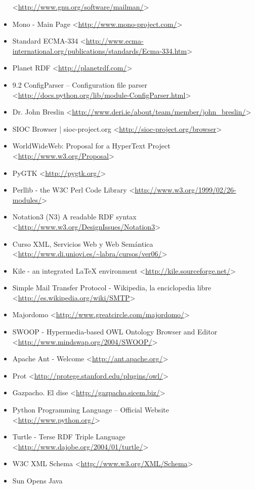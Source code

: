 \begin{itemize}
 <\url{http://www.gnu.org/software/mailman/}>
 \item Mono - Main Page 
 <\url{http://www.mono-project.com/}>
 \item Standard ECMA-334
 <\url{http://www.ecma-international.org/publications/standards/Ecma-334.htm}>
 \item Planet RDF
 <\url{http://planetrdf.com/}>
 \item 9.2 ConfigParser -- Configuration file parser
 <\url{http://docs.python.org/lib/module-ConfigParser.html}>
 \item Dr. John Breslin
 <\url{http://www.deri.ie/about/team/member/john_breslin/}>
 \item SIOC Browser | sioc-project.org
 <\url{http://sioc-project.org/browser}>
 \item WorldWideWeb: Proposal for a HyperText Project
 <\url{http://www.w3.org/Proposal}>
 \item PyGTK
 <\url{http://pygtk.org/}>
 \item Perllib - the W3C Perl Code Library
 <\url{http://www.w3.org/1999/02/26-modules/}>
 \item Notation3 (N3) A readable RDF syntax
 <\url{http://www.w3.org/DesignIssues/Notation3}>
 \item Curso XML, Servicios Web y Web Semántica
 <\url{http://www.di.uniovi.es/~labra/cursos/ver06/}>
 \item Kile - an integrated LaTeX environment
 <\url{http://kile.sourceforge.net/}>
 \item Simple Mail Transfer Protocol - Wikipedia, la enciclopedia libre
 <\url{http://es.wikipedia.org/wiki/SMTP}>
 \item Majordomo
 <\url{http://www.greatcircle.com/majordomo/}>
 \item SWOOP - Hypermedia-based OWL Ontology Browser and Editor
 <\url{http://www.mindswap.org/2004/SWOOP/}>
 \item Apache Ant - Welcome
 <\url{http://ant.apache.org/}>
 \item Prot
 <\url{http://protege.stanford.edu/plugins/owl/}>
 \item Gazpacho. El dise
 <\url{http://gazpacho.sicem.biz/}>
 \item Python Programming Language -- Official Website
 <\url{http://www.python.org/}>
 \item Turtle - Terse RDF Triple Language
 <\url{http://www.dajobe.org/2004/01/turtle/}>
 \item W3C XML Schema
 <\url{http://www.w3.org/XML/Schema}>
 \item Sun Opens Java

\end{itemize}
